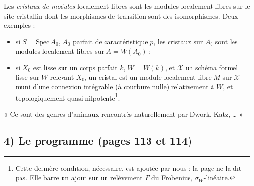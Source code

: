 \documentclass[11pt,a4paper]{article}
\begin{document}
Les \emph{cristaux de modules} localement libres sont les modules
localement libres sur le site cristallin dont les morphismes de
transition sont des isomorphismes. Deux exemples :
\begin{itemize}
  \item si $S = \mathrm{Spec}\, A_0$, $A_0$ parfait de caractéristique
  $p$, les cristaux sur $A_0$ sont les modules localement libres sur
  $A = W(A_0)$ ;
  \item si $X_0$ est lisse sur un corps parfait $k$, $W = W(k)$, et
  $\mathcal{X}$ un schéma formel lisse sur $W$ relevant $X_0$, un cristal
  est un module localement libre $M$ sur $\mathcal{X}$ muni d'une
  connexion intégrable (à courbure nulle) relativement à $W$, et
  topologiquement quasi-nilpotente\footnote{Cette dernière condition,
  nécessaire, est ajoutée par nous ; la page ne la dit pas. Elle barre
  un ajout sur un relèvement $F$ du Frobenius, $\sigma_W$-linéaire.}.
\end{itemize}
« Ce sont des genres d'animaux rencontrés naturellement par Dwork,
Katz, … »

\subsection*{4) Le programme (pages 113 et 114)}
\end{document}
